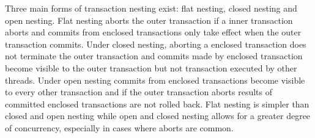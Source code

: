 Three main forms of transaction nesting exist: flat nesting, closed nesting and open nesting\cite[p. 1]{kumar2011hparstm}\cite[p. 42]{harris2010transactional}. Flat nesting aborts the outer transaction if a inner transaction aborts and commits from enclosed transactions only take effect when the outer transaction commits. Under closed nesting, aborting a enclosed transaction does not terminate the outer transaction and commits made by enclosed transaction become visible to the outer transaction but not transaction executed by other threads. Under open nesting commits from enclosed transactions become visible to every other transaction and if the outer transaction aborts results of committed enclosed transactions are not rolled back. Flat nesting is simpler than closed and open nesting while open and closed nesting allows for a greater degree of concurrency, especially in cases where aborts are common\cite[p. 43]{harris2010transactional}.

%
%
%
%        
%
%
%	
%
%
%

